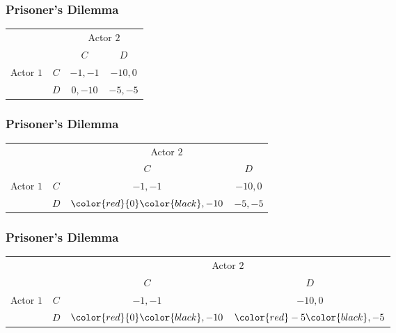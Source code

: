 \documentclass{beamer}
\begin{document}
 \begin{frame} 
 \frametitle{\LARGE{Prisoner's Dilemma}}
  \begin{table}
  	\LARGE
 	\begin{tabular}{cc|c|c|}
 		& \multicolumn{1}{c}{} & \multicolumn{2}{c}{Actor $2$}\\
 		& \multicolumn{1}{c}{} & \multicolumn{1}{c}{$C$}  & \multicolumn{1}{c}{$D$} \\\cline{3-4}
 		{Actor $1$}  & $C$ & $-1,-1$ & $-10,0$ \\\cline{3-4}
 		& $D$ & $0,-10$ & $-5,-5$ \\\cline{3-4}
 	\end{tabular}
 \end{table}
 \end{frame}


 \begin{frame} 
 \frametitle{\LARGE{Prisoner's Dilemma}}
 \begin{table}
 	\LARGE
 	\begin{tabular}{cc|c|c|}
 		& \multicolumn{1}{c}{} & \multicolumn{2}{c}{Actor $2$}\\
 		& \multicolumn{1}{c}{} & \multicolumn{1}{c}{$C$}  & \multicolumn{1}{c}{$D$} \\\cline{3-4}
 	{Actor $1$}  & $C$ & $-1,-1$ & $-10,0$ \\\cline{3-4}
 		& $D$ & $\color{red}{0}\color{black},-10$ & $-5,-5$ \\\cline{3-4}
 	\end{tabular}
 \end{table}
 \end{frame}

 \begin{frame} 
 \frametitle{\LARGE{Prisoner's Dilemma}}
 \begin{table}
 \LARGE
 \begin{tabular}{cc|c|c|}
 & \multicolumn{1}{c}{} & \multicolumn{2}{c}{Actor $2$}\\
 & \multicolumn{1}{c}{} & \multicolumn{1}{c}{$C$}  & \multicolumn{1}{c}{$D$} \\\cline{3-4}
 {Actor $1$}  & $C$ & $-1,-1$ & $-10,0$ \\\cline{3-4}
 & $D$ & $\color{red}{0}\color{black},-10$ & $\color{red}-5\color{black},-5$ \\\cline{3-4}
 \end{tabular}
 \end{table}
 \end{frame}
\end{document}

